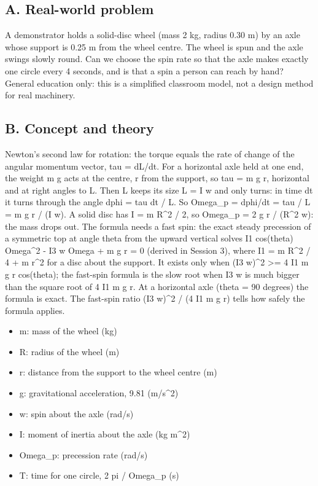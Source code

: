 \documentclass[11pt,a4paper]{article}
\begin{document}
\subsection*{A. Real-world problem}
A demonstrator holds a solid-disc wheel (mass 2 kg, radius 0.30 m) by an axle whose support is 0.25 m from the wheel centre. The wheel is spun and the axle swings slowly round. Can we choose the spin rate so that the axle makes exactly one circle every 4 seconds, and is that a spin a person can reach by hand? General education only: this is a simplified classroom model, not a design method for real machinery.

\subsection*{B. Concept and theory}
Newton's second law for rotation: the torque equals the rate of change of the angular momentum vector, tau = dL/dt. For a horizontal axle held at one end, the weight m g acts at the centre, r from the support, so tau = m g r, horizontal and at right angles to L. Then L keeps its size L = I w and only turns: in time dt it turns through the angle dphi = tau dt / L. So Omega\_p = dphi/dt = tau / L = m g r / (I w). A solid disc has I = m R\textasciicircum{}2 / 2, so Omega\_p = 2 g r / (R\textasciicircum{}2 w): the mass drops out. The formula needs a fast spin: the exact steady precession of a symmetric top at angle theta from the upward vertical solves I1 cos(theta) Omega\textasciicircum{}2 - I3 w Omega + m g r = 0 (derived in Session 3), where I1 = m R\textasciicircum{}2 / 4 + m r\textasciicircum{}2 for a disc about the support. It exists only when (I3 w)\textasciicircum{}2 \textgreater{}= 4 I1 m g r cos(theta); the fast-spin formula is the slow root when I3 w is much bigger than the square root of 4 I1 m g r. At a horizontal axle (theta = 90 degrees) the formula is exact. The fast-spin ratio (I3 w)\textasciicircum{}2 / (4 I1 m g r) tells how safely the formula applies.

\begin{itemize}[nosep]
\item m: mass of the wheel (kg)
\item R: radius of the wheel (m)
\item r: distance from the support to the wheel centre (m)
\item g: gravitational acceleration, 9.81 (m/s\textasciicircum{}2)
\item w: spin about the axle (rad/s)
\item I: moment of inertia about the axle (kg m\textasciicircum{}2)
\item Omega\_p: precession rate (rad/s)
\item T: time for one circle, 2 pi / Omega\_p (s)
\end{itemize}
\end{document}
